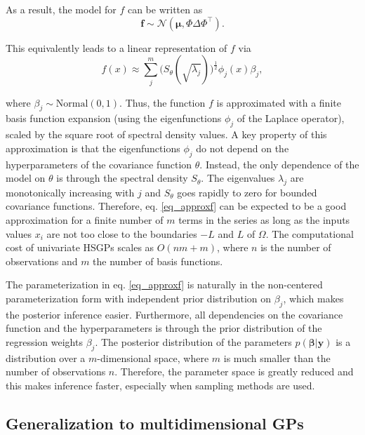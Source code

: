 \documentclass[onecolumn,a4paper,11pt]{article}
\begin{document}
\noindent As a result, the model for $f$ can be written as
%
\begin{equation}
\bm{f} \sim \mathcal{N}(\bm{\mu},\Phi \Delta \Phi^\intercal). \nonumber
\end{equation}

\noindent This equivalently leads to a linear representation of $f$ via
%
\begin{equation}\label{eq_approxf}
f(x) \approx \sum_{j}^m \big( S_{\theta}(\sqrt{\lambda_j})\big)^{\! \frac{1}{2}} \phi_j(x) \beta_j,
\end{equation}

\noindent where $\beta_j \sim \text{Normal}(0,1)$. Thus, the function $f$ is approximated with a finite basis function expansion (using the eigenfunctions $\phi_j$ of the Laplace operator), scaled by the square root of spectral density values. A key property of this approximation is that the eigenfunctions $\phi_j$ do not depend on the hyperparameters of the covariance function $\theta$. Instead, the only dependence of the model on $\theta$ is through the spectral density $S_{\theta}$. The eigenvalues $\lambda_j$ are monotonically increasing with $j$ and $S_{\theta}$ goes rapidly to zero for bounded covariance functions. Therefore, eq. \eqref{eq_approxf} can be expected to be a good approximation for a finite number of $m$ terms in the series as long as the inputs values $x_i$ are not too close to the boundaries $-L$ and $L$ of $\Omega$. The computational cost of univariate HSGPs scales as $O(nm + m)$, where $n$ is the number of observations and $m$ the number of basis functions.

The parameterization in eq. \eqref{eq_approxf} is naturally in the non-centered parameterization form with independent prior distribution on $\beta_j$, which makes the posterior inference easier. Furthermore, all dependencies on the covariance function and the hyperparameters is through the prior distribution of the regression weights $\beta_j$. The posterior distribution of the parameters $p(\bm{\beta}|\bm{y})$ is a distribution over a $m$-dimensional space, where $m$ is much smaller than the number of observations $n$. Therefore, the parameter space is greatly reduced and this makes inference faster, especially when sampling methods are used.

\subsection{Generalization to multidimensional GPs} \label{ch5_sec_method_multi}
\end{document}
